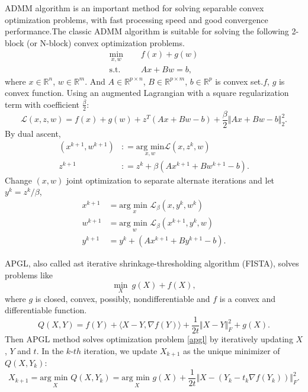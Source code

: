 \documentclass{article}
\begin{document}
{ADMM algorithm is an important method for solving separable convex optimization problems, with fast processing speed and good convergence performance.The classic ADMM algorithm is suitable for solving the following 2-block (or N-block) convex optimization problems.
\begin{equation}
	\label{admmlg}
	\begin{aligned}
		\underset{x,w}{\text{min}} \ \ \ \ &  \ \ f(x) + g(w)\\
		\text{s.t.} \ \ \ \ &  \ \  Ax+Bw = b,
	\end{aligned}
\end{equation}
where $x \in \mathbb{R}^n$, $w \in \mathbb{R}^m$. And $A \in \mathbb{R}^{p \times n}$, $B \in \mathbb{R}^{p \times m}$, $b \in \mathbb{R}^p$ is convex set.$f$, $g$ is convex function.
Using an augmented Lagrangian with a square regularization term with coefficient $\frac{\beta}{2}$:
\begin{equation}
	\mathcal{L}(x,z,w) = f(x) +g(w) + z^T(Ax+Bw-b) + \frac{\beta}{2} \Vert Ax+Bw-b \Vert_2^2.
\end{equation}
By dual ascent,
\begin{equation}
	\begin{aligned}
		(x^{k+1},w^{k+1}) & \colon = \underset{x,w}{\text{arg min}} \mathcal{L}(x,z^k,w)\\
		z^{k+1} & \colon = z^k + \beta (A x^{k+1} + B w^{k+1} - b).
	\end{aligned}
\end{equation}
Change $(x,w)$ joint optimization to separate alternate iterations and let $y^k = z^k/\beta$,
\begin{equation}
	\begin{aligned}
		x^{k+1} &  = \underset{x}{\text{arg min }} \mathcal{L}_{\beta}(x,y^k,w^{k})\\
		w^{k+1} &  = \underset{w}{\text{arg min }} \mathcal{L}_{\beta}(x^{k+1},y^k,w)\\
		y^{k+1} &  = y^k + (A x^{k+1} + B y^{k+1} - b).
	\end{aligned}
\end{equation}

APGL, also called ast iterative shrinkage-thresholding algorithm (FISTA), solves problems like
\begin{equation}
	\label{apgl}
	\underset{X}{\min} \ g(X)+f(X),
\end{equation}
where $g$ is closed, convex, possibly, nondifferentiable and $f$ is a convex and differentiable function. 
\begin{equation}
	Q(X,Y) = f(Y)+\langle X-Y, \nabla f(Y) \rangle + \frac{1}{2t}\Vert X-Y \Vert_F^2 +g(X).
\end{equation}
Then APGL method solves optimization problem \eqref{apgl} by iteratively updating $X$, $Y$ and $t$. In the $k$-$th$ iteration, we update $X_{k+1}$ as the unique minimizer of $Q(X, Y_k)$:
\begin{equation}
	X_{k+1} = \underset{X}{\text{arg min }}Q(X, Y_k) = \underset{X}{\text{arg min }}g(X)+\frac{1}{2t}\Vert X- (Y_k -t_k \nabla f(Y_k))\Vert_F^2.
\end{equation}


}
\end{document}
